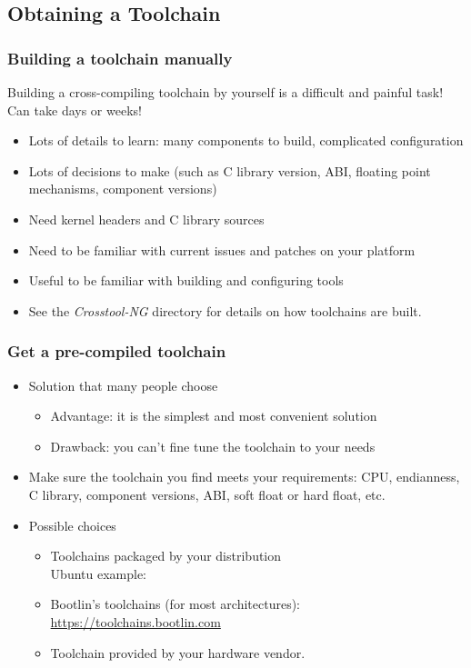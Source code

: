 \subsection{Obtaining a Toolchain}

\begin{frame}
  \frametitle{Building a toolchain manually}

  Building a cross-compiling toolchain by yourself is a difficult and painful
  task! Can take days or weeks!
  \begin{itemize}
  \item Lots of details to learn: many components to build, complicated
    configuration
  \item Lots of decisions to make (such as C library version, ABI, floating point
    mechanisms, component versions)
  \item Need kernel headers and C library sources
  \item Need to be familiar with current  issues and patches
    on your platform
  \item Useful to be familiar with building and configuring tools
  \item See the {\em Crosstool-NG}  directory for details
    on how toolchains are built.
\end{itemize}
\end{frame}

\begin{frame}
  \frametitle{Get a pre-compiled toolchain}
  \begin{itemize}
  \item Solution that many people choose
    \begin{itemize}
    \item Advantage: it is the simplest and most convenient solution
    \item Drawback: you can't fine tune the toolchain to your needs
    \end{itemize}
  \item Make sure the toolchain you find meets your requirements:
    CPU, endianness, C library, component versions, ABI, soft float
    or hard float, etc.
  \item Possible choices
    \begin{itemize}
    \item Toolchains packaged by your distribution\\
	  Ubuntu example:\\
    \item Bootlin's toolchains (for most architectures):
          \url{https://toolchains.bootlin.com}
    \item Toolchain provided by your hardware vendor.
    \end{itemize}
  \end{itemize}
\end{frame}

